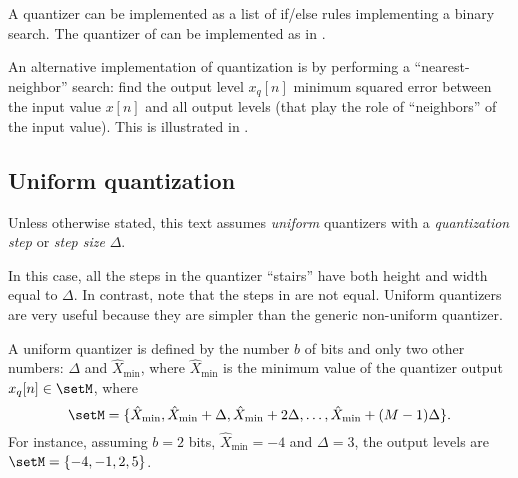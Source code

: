 A quantizer can be implemented as a list of if/else rules implementing a binary search.
The quantizer of  can be implemented as in . 


An alternative implementation of quantization is by performing a ``nearest-neighbor'' search: find the output level $x_q[n]$ minimum squared error between the input value $x[n]$ and all output levels (that play the role of ``neighbors'' of the input value). This is illustrated in .



\subsection{Uniform quantization}

Unless otherwise stated, this text assumes \emph{uniform} quantizers with a \emph{quantization step} or \emph{step size} $\Delta$. %

In this case, all the steps in the quantizer ``stairs'' have both height and width equal to $\Delta$. 
In contrast, note that the steps in  are not equal.
Uniform quantizers are very useful because they are simpler than the generic non-uniform quantizer. 

A uniform quantizer is defined by the number $b$ of bits and only two other numbers: $\Delta$ and $\hat X_{\textrm{min}}$, where $\hat X_{\textrm{min}}$ is the minimum value of the quantizer output $x_q[n] \in \setM$, where
\begin{equation}
\setM = \{\hat X_{\textrm{min}}, \hat X_{\textrm{min}}+\Delta,\hat X_{\textrm{min}}+2\Delta,\ldots,\hat X_{\textrm{min}}+(M-1)\Delta \}. 
\label{eq:uniform_quantizer_levels}
\end{equation}
For instance, assuming $b=2$ bits, $\hat X_{\textrm{min}} = -4$ and $\Delta=3$, the output levels are $\setM = \{-4, -1, 2, 5\}$.

